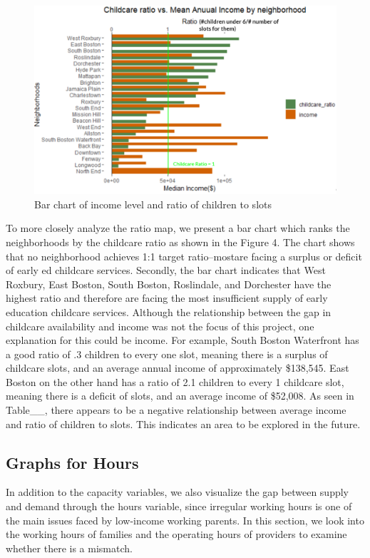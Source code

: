 \documentclass[10pt,letterpaper]{article}
\begin{document}
\begin{figure}

{\centering \includegraphics[width=0.8\linewidth]{income} 

}

\caption{Bar chart of income level and ratio of children to slots}\label{fig:unnamed-chunk-10}
\end{figure}

To more closely analyze the ratio map, we present a bar chart which
ranks the neighborhoods by the childcare ratio as shown in the Figure 4.
The chart shows that no neighborhood achieves 1:1 target ratio--mostare
facing a surplus or deficit of early ed childcare services. Secondly,
the bar chart indicates that West Roxbury, East Boston, South Boston,
Roslindale, and Dorchester have the highest ratio and therefore are
facing the most insufficient supply of early education childcare
services. Although the relationship between the gap in childcare
availability and income was not the focus of this project, one
explanation for this could be income. For example, South Boston
Waterfront has a good ratio of .3 children to every one slot, meaning
there is a surplus of childcare slots, and an average annual income of
approximately \$138,545. East Boston on the other hand has a ratio of
2.1 children to every 1 childcare slot, meaning there is a deficit of
slots, and an average income of \$52,008. As seen in Table\_\_, there
appears to be a negative relationship between average income and ratio
of children to slots. This indicates an area to be explored in the
future.

\subsection{Graphs for Hours}\label{graphs-for-hours}

In addition to the capacity variables, we also visualize the gap between
supply and demand through the hours variable, since irregular working
hours is one of the main issues faced by low-income working parents. In
this section, we look into the working hours of families and the
operating hours of providers to examine whether there is a mismatch.
\end{document}
